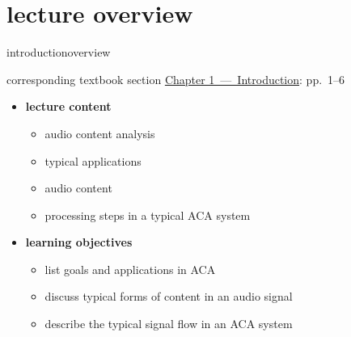 




\subtitle{Module 1.0: Introduction to MIR/ACA}


	

    \section[overview]{lecture overview}
        \begin{frame}{introduction}{overview}
            \begin{block}{corresponding textbook section}
                    \href{http://ieeexplore.ieee.org/xpl/articleDetails.jsp?tp=&arnumber=6331118&}{Chapter 1~---~Introduction}: pp.~1--6
            \end{block}

            \begin{itemize}
                \item   \textbf{lecture content}
                    \begin{itemize}
                        \item   audio content analysis
                        \item   typical applications
                        \item   audio content
                        \item   processing steps in a typical ACA system
                    \end{itemize}
                \bigskip
                \item<2->   \textbf{learning objectives}
                    \begin{itemize}
                        \item   list goals and applications in ACA
                        \item   discuss typical forms of content in an audio signal
                        \item   describe the typical signal flow in an ACA system
                    \end{itemize}
            \end{itemize}
        \end{frame}
        
